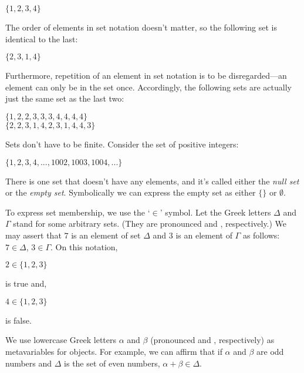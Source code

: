\begin{center}
\noindent{}$\{1, 2, 3, 4\}$
\end{center}

\noindent{}The order of elements in set notation doesn't matter, so the following set is identical to the last:

\begin{center}
\noindent{}$\{2, 3, 1, 4\}$
\end{center}

\noindent{}Furthermore, repetition of an element in set notation is to be disregarded---an element can only be in the set once.  Accordingly, the following sets are actually just the same set as the last two:

\begin{center}
\noindent{}$\{1, 2, 2, 3, 3, 3, 4, 4, 4, 4\}$\\
\noindent{}$\{2, 2, 3, 1, 4, 2, 3, 1, 4, 4, 3\}$
\end{center}

\noindent{}Sets don't have to be finite. Consider the set of positive integers:

\begin{center}
\noindent{}$\{1, 2, 3, 4, ..., 1002, 1003, 1004, ... \}$
\end{center}

There is one set that doesn't have any elements, and it's called either the \emph{null set} or the \emph{empty set}.  Symbolically we can express the empty set as either $\{ \}$ or $\emptyset$.

To express set membership, we use the `$\in$' symbol.  Let the Greek letters $\Delta$ and $\Gamma$ stand for some arbitrary sets. (They are pronounced  and , respectively.)  We may assert that $7$ is an element of set $\Delta$ and $3$ is an element of $\Gamma$ as follows: $7 \in \Delta$, $3 \in \Gamma$. On this notation,

\begin{center}
	\noindent{}$2\in\{1, 2, 3\}$
\end{center}

\noindent{}is true and,

\begin{center}
	\noindent{}$4\in\{1, 2, 3\}$ 
\end{center}

\noindent{}is false.

We use lowercase Greek letters $\alpha$ and $\beta$ (pronounced  and , respectively) as metavariables for objects. For example, we can affirm that if $\alpha$ and $\beta$ are odd numbers and $\Delta$ is the set of even numbers, $\alpha + \beta \in \Delta$.

